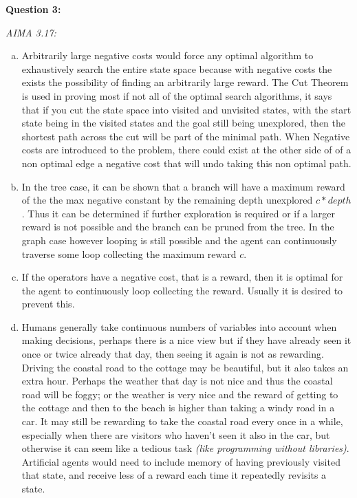 \noindent\textbf{Question 3:}


\noindent\emph{AIMA 3.17:}
\noindent\begin{enumerate}[a)]


\item Arbitrarily large negative costs would force any optimal algorithm to exhaustively search the entire state space because with negative costs the exists the possibility of finding an arbitrarily large reward. The Cut Theorem is used in proving most if not all of the optimal search algorithms, it says that if you cut the state space into visited and unvisited states, with the start state being in the visited states and the goal still being unexplored, then the shortest path across the cut will be part of the minimal path. When Negative costs are introduced to the problem, there could exist at the other side of of a non optimal edge a negative cost that will undo taking this non optimal path.


\item In the tree case, it can be shown that a branch will have a maximum reward of the the max negative constant by the remaining depth unexplored $c*depth$. Thus it can be determined if further exploration is required or if a larger reward is not possible and the branch can be pruned from the tree. In the graph case however looping is still possible and the agent can continuously traverse some loop collecting the maximum reward $c$.  


\item If the operators have a negative cost, that is a reward, then it is optimal for the agent to continuously loop collecting the reward. Usually it is desired to prevent this. 


\item Humans generally take continuous numbers of variables into account when making decisions, perhaps there is a nice view but if they have already seen it once or twice already that day, then seeing it again is not as rewarding. Driving the coastal road to the cottage may be beautiful, but it also takes an extra hour. Perhaps the weather that day is not nice and thus the coastal road will be foggy; or the weather is very nice and the reward of getting to the cottage and then to the beach is higher than taking a windy road in a car. It may still be rewarding to take the coastal road every once in a while, especially when there are visitors who haven't seen it also in the car, but otherwise it can seem like a tedious task \emph{(like programming without libraries)}. Artificial agents would need to include memory of having previously visited that state, and receive less of a reward each time it repeatedly revisits a state.



\end{enumerate}
